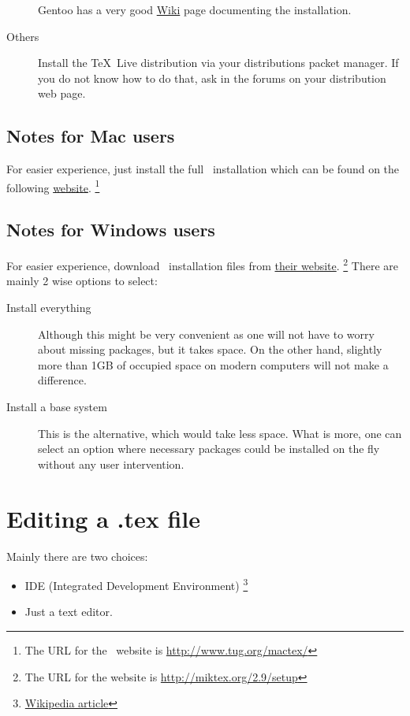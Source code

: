\begin{description}
        Gentoo has a very good
        \href{http://www.gentoo.org/proj/en/tex/texlive-migration-guide.xml}{Wiki}
        page documenting the installation.
    \item[Others]
        Install the \TeX\ Live distribution via your distributions packet
        manager. If you do not know how to do that, ask in the forums on your
        distribution web page.
\end{description}

\subsection{Notes for Mac users}

For easier experience, just install the full \MacTeX\ installation which can be
found on the following \href{http://www.tug.org/mactex/}{website}.
\footnote{The URL for the \MacTeX\ website is \url{http://www.tug.org/mactex/}}

\subsection{Notes for Windows users}

For easier experience, download \MiKTeX\ installation files from
\href{http://miktex.org/2.9/setup}{their website}.
\footnote{The URL for the website is \url{http://miktex.org/2.9/setup}}
There are mainly 2 wise options to select:
\begin{description}
    \item[Install everything] Although this might be very convenient as
        one will not have to worry about missing packages, but it takes space.
        On the other hand, slightly more than 1GB of occupied space on modern
        computers will not make a difference.
    \item[Install a base system] This is the alternative, which would take less
        space. What is more, one can select an option where necessary packages
        could be installed on the fly without any user intervention.
\end{description}

\section{Editing a .tex file}

Mainly there are two choices:
\begin{itemize}
    \item IDE (Integrated Development Environment)
        \footnote{\href{https://secure.wikimedia.org/wikipedia/en/wiki/Integrated_development_environment}{Wikipedia
        article}}
    \item Just a text editor.
\end{itemize}

